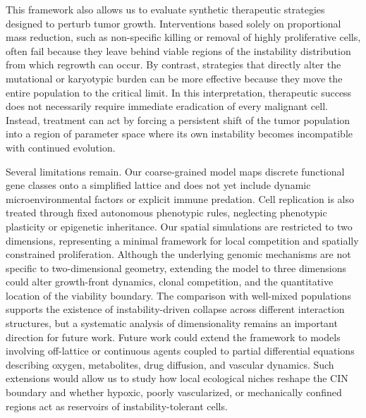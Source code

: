 \documentclass[10pt, aps, rmp,  twocolumn, superscriptaddress, floatfix, showkeys]{revtex4-2}
\begin{document}
This framework also allows us to evaluate synthetic therapeutic 
strategies designed to perturb tumor growth. Interventions based 
solely on proportional mass reduction, such as non-specific killing 
or removal of highly proliferative cells, often fail because they 
leave behind viable regions of the instability distribution from 
which regrowth can occur. By contrast, strategies that directly 
alter the mutational or karyotypic burden can be more effective 
because they move the entire population to the critical 
limit. In this interpretation, therapeutic success does not 
necessarily require immediate eradication of every malignant cell. 
Instead, treatment can act by forcing a persistent shift of the 
tumor population into a region of parameter space where its own 
instability becomes incompatible with continued evolution. 

Several limitations remain. Our coarse-grained model maps discrete 
functional gene classes onto a simplified lattice and does not yet 
include dynamic microenvironmental factors or explicit immune 
predation. Cell replication is also 
treated through fixed autonomous phenotypic rules, neglecting 
phenotypic plasticity or epigenetic inheritance. Our spatial simulations are restricted to two dimensions, representing a minimal framework for local competition and spatially constrained proliferation. Although the underlying genomic mechanisms are not specific to two-dimensional geometry, extending the model to three dimensions could alter growth-front dynamics, clonal competition, and the quantitative location of the viability boundary. The comparison with well-mixed populations supports the existence of instability-driven collapse across different interaction structures, but a systematic analysis of dimensionality remains an important direction for future work. Future work could extend the framework to models involving off-lattice or continuous agents coupled to partial differential equations describing oxygen, 
metabolites, drug diffusion, and vascular dynamics. Such extensions 
would allow us to study how local ecological niches reshape the CIN 
boundary and whether hypoxic, poorly vascularized, or mechanically 
confined regions act as reservoirs of instability-tolerant cells.
\end{document}
